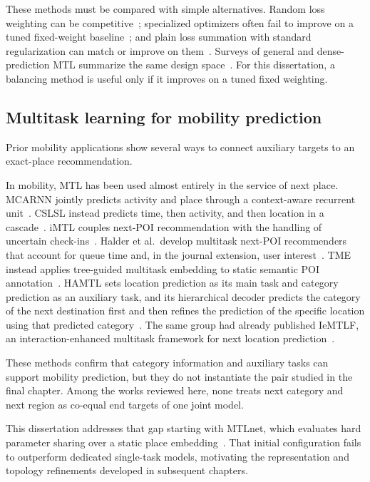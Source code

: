 These methods must be compared with
simple alternatives. Random loss weighting can be competitive~\cite{lin2022rlw};
specialized optimizers often fail to improve on a tuned fixed-weight
baseline~\cite{xin2022domtl}; and plain loss summation with standard regularization
can match or improve on them~\cite{kurin2022scalarization}. Surveys of general and
dense-prediction MTL summarize the same design
space~\cite{vandenhende2022mtl,yu2024survey}. For this dissertation, a balancing
method is useful only if it improves on a tuned fixed weighting.

\subsection{Multitask learning for mobility prediction}

Prior mobility applications show several ways to connect auxiliary targets to an
exact-place recommendation.

In mobility, MTL has been used almost entirely in the service of next place. MCARNN jointly
predicts activity and place through a context-aware recurrent
unit~\cite{Liao2018}. CSLSL instead predicts time, then activity, and then location in
a cascade~\cite{huang2024cslsl}. iMTL couples next-POI recommendation with the
handling of uncertain check-ins~\cite{Zhang2020}. Halder et al.\ develop multitask
next-POI recommenders that account for queue time and, in the journal extension, user
interest~\cite{Halder2021,Halder2022}. TME instead applies tree-guided multitask
embedding to static semantic POI annotation~\cite{Xu2023}. HAMTL sets location
prediction as its main task and category prediction as an auxiliary task, and its
hierarchical decoder predicts the category of the next destination first and then
refines the prediction of the specific location using that predicted
category~\cite{wang2025hamtl}. The same group had already published IeMTLF, an
interaction-enhanced multitask framework for next location
prediction~\cite{wang2024iemtlf}.

These methods confirm that category information and auxiliary tasks can support
mobility prediction, but they do not instantiate the pair studied in the final
chapter. Among the works reviewed here, none treats next category and next region as
co-equal end targets of one joint model.

This dissertation addresses that gap starting with MTLnet, which evaluates hard
parameter sharing over a static place embedding~\cite{silva2025mtlnet}. That initial
configuration fails to outperform dedicated single-task models, motivating the
representation and topology refinements developed in subsequent chapters.


